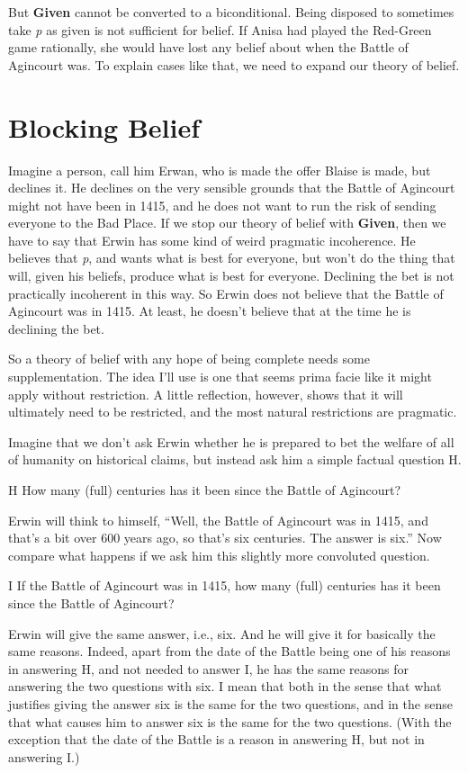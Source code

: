 \documentclass[
  11pt,
]{book}
\begin{document}
But \textbf{Given} cannot be converted to a biconditional. Being disposed to sometimes take \emph{p} as given is not sufficient for belief. If Anisa had played the Red-Green game rationally, she would have lost any belief about when the Battle of Agincourt was. To explain cases like that, we need to expand our theory of belief.

\hypertarget{block}{%
\section{Blocking Belief}\label{block}}

Imagine a person, call him Erwan, who is made the offer Blaise is made, but declines it. He declines on the very sensible grounds that the Battle of Agincourt might not have been in 1415, and he does not want to run the risk of sending everyone to the Bad Place. If we stop our theory of belief with \textbf{Given}, then we have to say that Erwin has some kind of weird pragmatic incoherence. He believes that \emph{p}, and wants what is best for everyone, but won't do the thing that will, given his beliefs, produce what is best for everyone. Declining the bet is not practically incoherent in this way. So Erwin does not believe that the Battle of Agincourt was in 1415. At least, he doesn't believe that at the time he is declining the bet.

So a theory of belief with any hope of being complete needs some supplementation. The idea I'll use is one that seems prima facie like it might apply without restriction. A little reflection, however, shows that it will ultimately need to be restricted, and the most natural restrictions are pragmatic.

Imagine that we don't ask Erwin whether he is prepared to bet the welfare of all of humanity on historical claims, but instead ask him a simple factual question H.

H How many (full) centuries has it been since the Battle of Agincourt?

Erwin will think to himself, ``Well, the Battle of Agincourt was in 1415, and that's a bit over 600 years ago, so that's six centuries. The answer is six.'' Now compare what happens if we ask him this slightly more convoluted question.

I If the Battle of Agincourt was in 1415, how many (full) centuries has it been since the Battle of Agincourt?

Erwin will give the same answer, i.e., six. And he will give it for basically the same reasons. Indeed, apart from the date of the Battle being one of his reasons in answering H, and not needed to answer I, he has the same reasons for answering the two questions with six. I mean that both in the sense that what justifies giving the answer six is the same for the two questions, and in the sense that what causes him to answer six is the same for the two questions. (With the exception that the date of the Battle is a reason in answering H, but not in answering I.)
\end{document}
